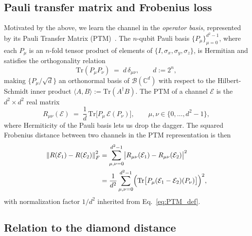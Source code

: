 \documentclass[%
 reprint,
superscriptaddress,
 amsmath,amssymb,
 aps,
]{revtex4-2}
\newcommand{\E}{\mathcal{E}}
\newcommand{\norm}[1]{\left\lVert#1\right\rVert}
\begin{document}
\subsection{Pauli transfer matrix and Frobenius loss}
\label{sec:PTM_and_Frobenius}

Motivated by the above, we learn the channel in the \emph{operator basis}, represented by its Pauli Transfer Matrix (PTM)~\cite{greenbaum2015gst,chow2009randomized}. The $n$-qubit Pauli basis $\{P_\mu\}_{\mu=0}^{d^2-1}$, where each $P_\mu$ is an $n$-fold tensor product of elements of $\{I,\sigma_x,\sigma_y,\sigma_z\}$, is Hermitian and satisfies the orthogonality relation
\begin{equation}
    \mathrm{Tr}(P_\mu P_\nu) \;=\; d\,\delta_{\mu\nu},\qquad d:=2^n,
    \label{eq:pauli_orthogonality}
\end{equation}
making $\{P_\mu/\sqrt{d}\}$ an orthonormal basis of $\mathcal{B}(\mathbb{C}^d)$ with respect to the Hilbert-Schmidt inner product $\langle A,B\rangle:=\mathrm{Tr}(A^\dagger B)$. The PTM of a channel $\E$ is the $d^2\times d^2$ real matrix~\cite{greenbaum2015gst}
\begin{equation}
    R_{\mu\nu}(\E) \;=\; \frac{1}{d}\,\mathrm{Tr}\bigl[P_\mu\,\E(P_\nu)\bigr],\qquad \mu,\nu\in\{0,\ldots,d^2-1\},
    \label{eq:PTM_def}
\end{equation}
where Hermiticity of the Pauli basis lets us drop the dagger. The squared Frobenius distance between two channels in the PTM representation is then
\begin{equation}
\begin{split}
    \norm{R(\E_1)-R(\E_2)}_F^2 &= \sum_{\mu,\nu=0}^{d^2-1}\bigl|R_{\mu\nu}(\E_1)-R_{\mu\nu}(\E_2)\bigr|^2\\
    &= \frac{1}{d^2}\sum_{\mu,\nu=0}^{d^2-1}\Bigl(\mathrm{Tr}\bigl[P_\mu(\E_1-\E_2)(P_\nu)\bigr]\Bigr)^2,
\end{split}
    \label{eq:FrobeniusR_definition}
\end{equation}
with normalization factor $1/d^2$ inherited from Eq.~\eqref{eq:PTM_def}.

\subsection{Relation to the diamond distance}
\end{document}
